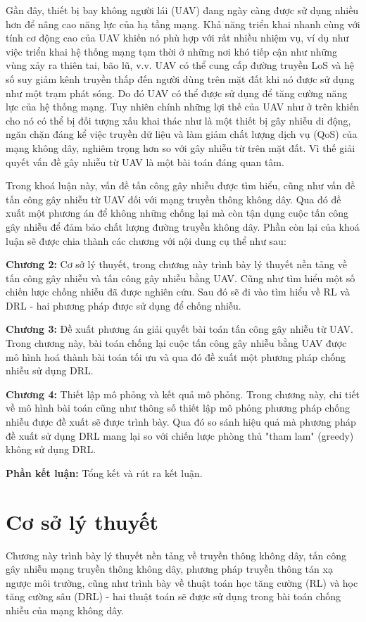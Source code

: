 \documentclass{uetgraduation}
\begin{document}
Gần đây, thiết bị bay không người lái (UAV) đang ngày càng được sử dụng nhiều hơn để nâng cao năng lực của hạ tầng mạng. Khả năng
triển khai nhanh cùng với tính cơ động cao của UAV khiến nó phù hợp với rất nhiều nhiệm vụ, ví dụ như việc triển khai hệ thống
mạng tạm thời ở những nơi khó tiếp cận như những vùng xảy ra thiên tai, bão lũ, v.v. UAV có thể cung cấp đường truyền LoS và hệ số suy
giảm kênh truyền thấp đến người dùng trên mặt đất khi nó được sử dụng như một trạm phát sóng. Do đó UAV có thể được sử dụng để
tăng cường năng lực của hệ thống mạng. Tuy nhiên chính những lợi thế của UAV như ở trên khiến cho nó có thể bị đối tượng xấu 
khai thác như là một thiết bị gây nhiễu di động, ngăn chặn đáng kể việc truyền dữ liệu và làm giảm chất lượng dịch vụ (QoS) của mạng
không dây, nghiêm trọng hơn so với gây nhiễu từ trên mặt đất. Vì thế giải quyết vấn đề gây nhiễu từ UAV là một bài toán đáng quan tâm.

Trong khoá luận này, vấn đề tấn công gây nhiễu được tìm hiểu, cũng như vấn đề tấn công gây nhiễu từ UAV đối với mạng truyền thông không dây.
Qua đó đề xuất một phương án để không những chống lại mà còn tận dụng cuộc tấn công gây nhiễu để đảm bảo chất lượng đường truyền không dây.
Phần còn lại của khoá luận sẽ được chia thành các chương với nội dung cụ thể như sau:

\textbf{Chương 2:} Cơ sở lý thuyết, trong chương này trình bày lý thuyết nền tảng về tấn công gây nhiễu và tấn công gây nhiễu bằng UAV.
Cũng như tìm hiểu một số chiến lược chống nhiễu đã được nghiên cứu. Sau đó sẽ đi vào tìm hiểu về RL và DRL - hai phương pháp được
sử dụng để chống nhiễu.

\textbf{Chương 3:} Đề xuất phương án giải quyết bài toán tấn công gây nhiễu từ UAV. Trong chương này, bài toán chống lại cuộc tấn công
gây nhiễu bằng UAV được mô hình hoá thành bài toán tối ưu và qua đó đề xuất một phương pháp chống nhiễu sử dụng DRL.

\textbf{Chương 4:} Thiết lập mô phỏng và kết quả mô phỏng. Trong chương này, chi tiết về mô hình bài toán cũng như thông số thiết lập mô
phỏng phương pháp chống nhiễu được đề xuất sẽ được trình bày. Qua đó so sánh hiệu quả mà phương pháp đề xuất sử dụng DRL mang lại so với chiến lược phòng thủ 
"tham lam" (greedy) không sử dụng DRL.

\textbf{Phần kết luận:} Tổng kết và rút ra kết luận.

\chapter{Cơ sở lý thuyết}
Chương này trình bày lý thuyết nền tảng về truyền thông không dây, tấn công gây nhiễu mạng truyền thông không dây, phương pháp truyền thông tán xạ ngược môi trường,
cũng như trình bày về thuật toán học tăng cường (RL) và học tăng cường sâu (DRL) - hai thuật toán sẽ được sử dụng trong bài toán chống nhiễu của mạng không dây.
\end{document}
